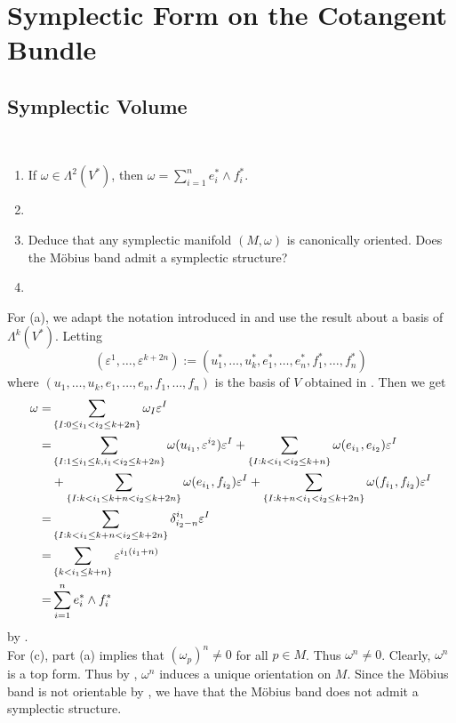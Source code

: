 \chapter{Symplectic Form on the Cotangent Bundle}
\section{Symplectic Volume}
\begin{exercise}
~
\begin{enumerate}[label = \textup{(}\alph*\textup{)}]
\item If $\omega \in \Lambda^2(V^*)$, then $\omega = \sum_{i = 1}^n e^*_i \wedge f^*_i$.
\item
\item Deduce that any symplectic manifold $(M,\omega)$ is canonically oriented. Does the M\"obius band admit a symplectic structure?
\item
\end{enumerate}
\label{ex:orientable}
\end{exercise}

\begin{solution}
For (a), we adapt the notation introduced in \cite[351--354]{lee:smooth_manifolds:2013} and use the result about a basis of $\Lambda^k(V^*)$. Letting 
\begin{equation*}
(\varepsilon^1, \dots, \varepsilon^{k + 2n}) := (u^*_1,\dots,u^*_k,e^*_1,\dots,e^*_n,f^*_1,\dots,f^*_n)
\end{equation*}
\noindent where $(u_1,\dots,u_k,e_1,\dots,e_n,f_1,\dots,f_n)$ is the basis of $V$ obtained in \cite[3]{dasilva:symplectic:2008}. Then we get
\begin{align*}
\omega =& \sum_{\cbr[0]{I : 0 \leq i_1 < i_2 \leq k + 2n}} \omega_I\varepsilon^I\\
=& \sum_{\cbr[0]{I : 1 \leq i_1 \leq k, i_1 < i_2 \leq k + 2n}} \omega(u_{i_1},\varepsilon^{i_2})\varepsilon^I + \sum_{\cbr[0]{I : k < i_1 < i_2 \leq k + n}}\omega(e_{i_1},e_{i_2})\varepsilon^I\\
&+ \sum_{\cbr[0]{I : k < i_1 \leq k + n < i_2 \leq k + 2n}}\omega(e_{i_1},f_{i_2})\varepsilon^I + \sum_{\cbr[0]{I : k + n < i_1 < i_2 \leq k + 2n}}\omega(f_{i_1},f_{i_2})\varepsilon^I\\
=& \sum_{\cbr[0]{I : k < i_1 \leq k + n < i_2 \leq k + 2n}}\delta^{i_1}_{i_2 - n}\varepsilon^I\\
=& \sum_{\cbr[0]{k < i_1 \leq k + n}} \varepsilon^{i_1(i_1 + n)}\\
=& \sum_{i = 1}^n e^*_i \wedge f^*_i
\end{align*}
\noindent by \cite[356]{lee:smooth_manifolds:2013}.\\
For (c), part (a) implies that $(\omega_p)^n \neq 0$ for all $p \in M$. Thus $\omega^n \neq 0$. Clearly, $\omega^n$ is a top form. Thus by \cite[381]{lee:smooth_manifolds:2013}, $\omega^n$ induces a unique orientation on $M$. Since the M\"obius band is not orientable by \cite[393]{lee:smooth_manifolds:2013}, we have that the M\"obius band does not admit a symplectic structure.
\end{solution}

